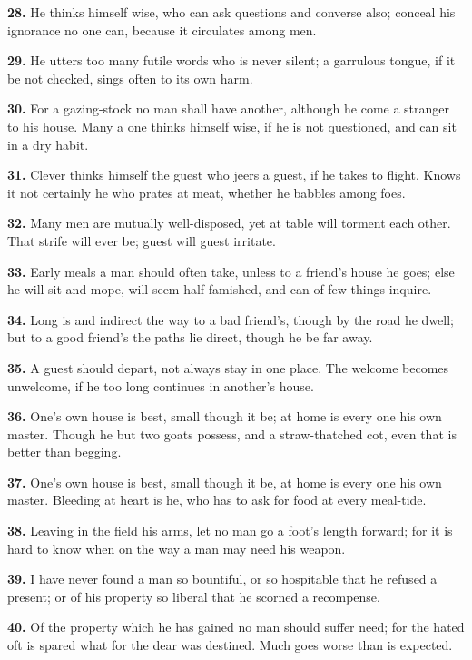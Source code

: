 \textbf{28.} He thinks himself wise, who can ask questions and converse also;
conceal his ignorance no one can, because it circulates among men.

\textbf{29.} He utters too many futile words who is never silent; a garrulous
tongue, if it be not checked, sings often to its own harm.

\textbf{30.} For a gazing-stock no man shall have another, although he come a
stranger to his house. Many a one thinks himself wise, if he is not
questioned, and can sit in a dry habit.

\textbf{31.} Clever thinks himself the guest who jeers a guest, if he takes
to flight. Knows it not certainly he who prates at meat, whether he
babbles among foes.

\textbf{32.} Many men are mutually well-disposed, yet at table will torment
each other. That strife will ever be; guest will guest irritate.

\textbf{33.} Early meals a man should often take, unless to a friend's house
he goes; else he will sit and mope, will seem half-famished, and can
of few things inquire.

\textbf{34.} Long is and indirect the way to a bad friend's, though by the
road he dwell; but to a good friend's the paths lie direct, though he
be far away.

\textbf{35.} A guest should depart, not always stay in one place. The welcome
becomes unwelcome, if he too long continues in another's house.

\textbf{36.} One's own house is best, small though it be; at home is every
one his own master. Though he but two goats possess, and a
straw-thatched cot, even that is better than begging.

\textbf{37.} One's own house is best, small though it be, at home is every
one his own master. Bleeding at heart is he, who has to ask for food
at every meal-tide.

\textbf{38.} Leaving in the field his arms, let no man go a foot's length
forward; for it is hard to know when on the way a man may need his
weapon.

\textbf{39.} I have never found a man so bountiful, or so hospitable that he
refused a present; or of his property so liberal that he scorned a
recompense.

\textbf{40.} Of the property which he has gained no man should suffer need;
for the hated oft is spared what for the dear was destined. Much goes
worse than is expected.

